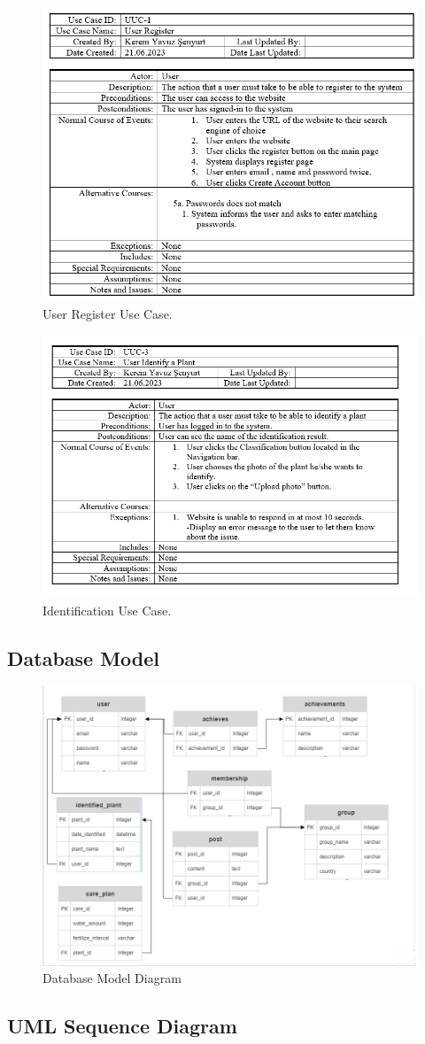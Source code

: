 \documentclass[conference]{IEEEtran}
\begin{document}
\begin{figure}[H]
\centerline{\includegraphics[width=0.48 \textwidth]{images/userRegisterUseCase.png}}
\caption{User Register Use Case.}
\label{fig:graph5}
\end{figure}


\begin{figure}[H]
\centerline{\includegraphics[width=0.48 \textwidth]{images/IdentifyUseCase.png}}
\caption{Identification Use Case.}
\label{fig:graph5}
\end{figure}


\subsection{Database Model}

\begin{figure}[H]
\centerline{\includegraphics[width=0.48 \textwidth]{images/classDiagram.png}}
\caption{Database Model Diagram}
\label{fig:graph5}
\end{figure}


\subsection{UML Sequence Diagram}
\end{document}
